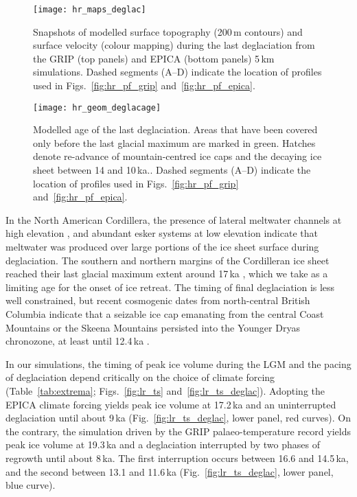 \documentclass[tc, manuscript]{copernicus}
\begin{document}
\begin{figure*}
  \texttt{[image: hr\_maps\_deglac]}
  \caption{Snapshots of modelled surface topography (200\,m contours)
           and surface velocity (colour mapping) during the last deglaciation
           from the GRIP (top panels) and EPICA (bottom panels) 5\,km simulations.
           Dashed segments (A--D) indicate the location of profiles used in
           Figs.~\ref{fig:hr_pf_grip} and~\ref{fig:hr_pf_epica}.}
  \label{fig:hr_geom_deglacageshots}
\end{figure*}

\begin{figure*}
  \vspace{-1.5mm}  %
  \texttt{[image: hr\_geom\_deglacage]}
  \caption{Modelled age of the last deglaciation. Areas that have been covered
           only before the last glacial maximum are marked
           in green. Hatches denote re-advance of mountain-centred ice caps and
           the decaying ice sheet between 14 and 10\,ka..
           Dashed segments (A--D) indicate the location of profiles used in
           Figs.~\ref{fig:hr_pf_grip} and~\ref{fig:hr_pf_epica}.}
  \label{fig:hr_geom_deglacage}
\end{figure*}

In the North American Cordillera, the presence of lateral meltwater channels
at high elevation \citep{Margold.etal.2011, Margold.etal.2013a,
Margold.etal.2014}, and abundant esker systems at low elevation
\citep{Burke.etal.2012, Burke.etal.2012a, Perkins.etal.2013, Margold.etal.2013}
indicate that meltwater was produced over large portions of the ice sheet
surface during deglaciation. The southern and northern margins of the
Cordilleran ice sheet reached their last glacial maximum extent around
17\,ka \citep[Sect.~\ref{sec:timing};][]{Porter.Swanson.1998, Cosma.etal.2008,
Stroeven.etal.2010, Stroeven.etal.2014}, which we take as a limiting age for
the onset of ice retreat. The timing of final deglaciation is less well
constrained, but recent cosmogenic dates from north-central British Columbia
indicate that a seizable ice cap emanating from the central Coast Mountains or
the Skeena Mountains persisted into the Younger Dryas chronozone, at least
until 12.4\,ka \citep{Margold.etal.2014}.

In our simulations, the timing of peak ice volume during the LGM
and the pacing of deglaciation depend critically on the choice of
climate forcing (Table~\ref{tab:extrema}; Figs.~\ref{fig:lr_ts}
and~\ref{fig:lr_ts_deglac}). Adopting the EPICA climate forcing yields peak ice
volume at 17.2\,ka and an uninterrupted deglaciation until about 9\,ka
(Fig.~\ref{fig:lr_ts_deglac}, lower panel, red curves). On the contrary, the
simulation driven by the GRIP palaeo-temperature record yields peak ice volume
at 19.3\,ka and a deglaciation interrupted by two phases of regrowth until
about 8\,ka. The first interruption occurs between 16.6 and 14.5\,ka, and the
second between 13.1 and 11.6\,ka (Fig.~\ref{fig:lr_ts_deglac}, lower panel,
blue curve).
\end{document}
